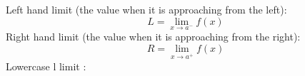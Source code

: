 \documentclass{article}
\begin{document}
	\noindent Left hand limit (the value when it is approaching from the left):\[L=\lim_{x\to a^-}f(x)\]
	Right hand limit (the value when it is approaching from the right):\[R=\lim_{x\to a^+}f(x)\]
	Lowercase l limit : 
	
\end{document}
